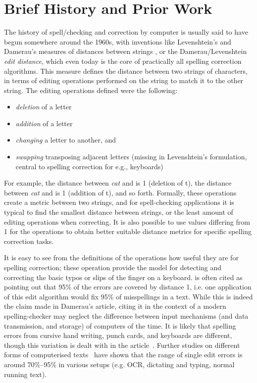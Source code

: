 \documentclass[officiallayout,final]{unihelcompling}
\newcommand\misspelt{\bgroup\markoverwith
{\textcolor{red}{\lower3.5pt\hbox{\sixly \char58}}}\ULon}
\begin{document}
\section{Brief History and Prior Work}
\label{sec:history}

The history of spell\-/checking and correction by computer is usually said to
have begun somewhere around the 1960s, with inventions like Levenshtein's and
Damerau's measures of distances between strings
\citep{levenshtein1966binary,damerau1964technique}, or the
Damerau\-/Levenshtein \emph{edit distance}, which even today is the core of
practically all spelling correction algorithms. This measure defines the
distance between two strings of characters, in terms of editing operations
performed on the string to match it to the other string. The editing operations
defined were the following:

\begin{itemize}
    \item \emph{deletion} of a letter
    \item \emph{addition} of a letter
    \item \emph{changing} a letter to another, and
    \item \emph{swapping} transposing adjacent letters (missing in
        Levenshtein's formulation, central to spelling correction for
        e.g., keyboards)
\end{itemize}

For example, the distance between \emph{cat} and \misspelt{ca} is 1 (deletion
of t), the distance between \emph{cat} and \misspelt{catt} is 1 (addition of
t), and so forth. Formally, these operations create a metric between two
strings, and for spell-checking applications it is typical to find the smallest
distance between strings, or the least amount of editing operations when
correcting. It is also possible to use values differing from 1 for the
operations to obtain better suitable distance metrics for specific spelling
correction tasks.

It is easy to see from the definitions of the operations how useful they are
for spelling correction; these operation provide the model for detecting and
correcting the basic typos or slips of the finger on a keyboard.
\citet{damerau1964technique} is often cited as pointing out that 95\% of the
errors are covered by distance 1, i.e. one application of this edit algorithm
would fix 95\% of misspellings in a text.  While this is indeed the claim made
in Damerau's article, citing it in the context of a modern spelling-checker may
neglect the difference between input mechanisms (and data transmission, and
storage) of computers of the time. It is likely that spelling errors from
cursive hand writing, punch cards, and keyboards are different, though this
variation is dealt with in the article~\citep{damerau1964technique}. Further
studies on different forms of computerised texts~\citep{kukich1992techniques}
have shown that the range of single edit errors is around 70\%--95\% in various
setups (e.g. OCR, dictating and typing, normal running text).
\end{document}
